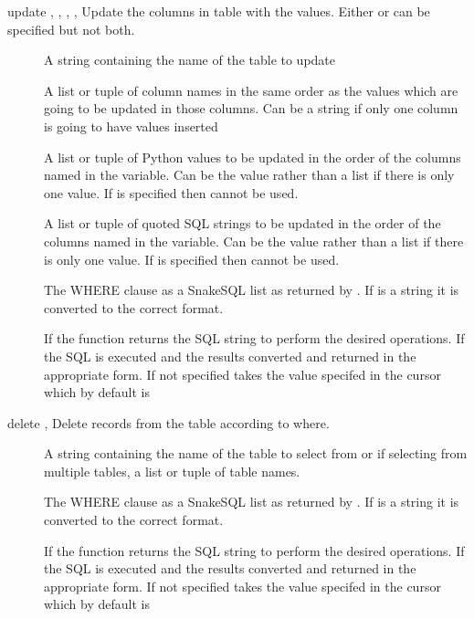 \documentclass{howto}
\begin{document}
 
\begin{methoddesc}[cursor]{update}{ , , , ,  }
Update the columns in table with the values. Either  or  can be specified but not both.
\begin{description}
\item[]
A string containing the name of the table to update
\item[]
A list or tuple of column names in the same order as the values which are going to be updated in those columns. Can be a string if only one column is going to have values inserted
\item[]
A list or tuple of Python values to be updated in the order of the columns named in the  variable. Can be the value rather than a list if there is only one value. If  is specified then  cannot be used.
\item[]
A list or tuple of quoted SQL strings to be updated in the order of the columns named in the  variable. Can be the value rather than a list if there is only one value. If  is specified then  cannot be used.
\item[]
The WHERE clause as a SnakeSQL list as returned by . If  is a string it is converted to the correct format.
\item[]
If  the function returns the SQL string to perform the desired operations. If  the SQL is executed and the results converted and returned in the appropriate form. If not specified takes the value specifed in the cursor which by default is 
\end{description}
\end{methoddesc}

\begin{methoddesc}[cursor]{delete}{ ,  }
Delete records from the table according to where.
\begin{description}
\item[]
A string containing the name of the table to select from or if selecting from multiple tables, a list or tuple of table names.
\item[]
The WHERE clause as a SnakeSQL list as returned by . If  is a string it is converted to the correct format.
\item[]
If  the function returns the SQL string to perform the desired operations. If  the SQL is executed and the results converted and returned in the appropriate form. If not specified takes the value specifed in the cursor which by default is 
\end{description}
\end{methoddesc}
\end{document}
